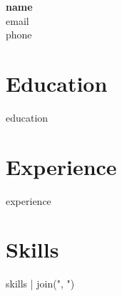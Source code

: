 \documentclass{article}
\begin{document}
\begin{center}
    {\Large \textbf{{{{ name }}}}} \\
    {{{{ email }}}} \\
    {{{{ phone }}}}
\end{center}

\section*{Education}
{{{{ education }}}}

\section*{Experience}
{{{{ experience }}}}

\section*{Skills}
{{{{ skills | join(", ") }}}}
\end{document}
